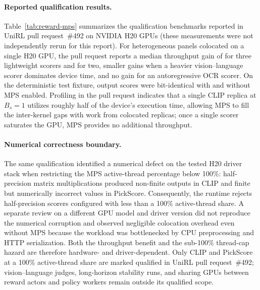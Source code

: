 \begin{table}[H]
\caption{Throughput gain (\%) of NVIDIA MPS over fractional GPU colocation without MPS for two or three replicas of a single scorer on one NVIDIA H20 GPU, as reported in UniRL pull request~\#492; $B_s$ denotes the scorer batch size. Dashes indicate batch sizes at which the scorer implementation does not execute a single batched forward pass.}
\label{tab:reward-mps}
\centering
\small

\end{table}

\paragraph{Reported qualification results.}
Table~\ref{tab:reward-mps} summarizes the qualification benchmarks reported in UniRL pull request~\#492 on NVIDIA H20 GPUs (these measurements were not independently rerun for this report).
For heterogeneous panels colocated on a single H20 GPU, the pull request reports a median throughput gain of \RSMpsThreeLight{} for three lightweight scorers and \RSMpsTwoLight{} for two, smaller gains when a heavier vision--language scorer dominates device time, and no gain for an autoregressive OCR scorer.
On the deterministic test fixture, output scores were bit-identical with and without MPS enabled.
Profiling in the pull request indicates that a single CLIP replica at $B_s{=}1$ utilizes roughly half of the device's execution time, allowing MPS to fill the inter-kernel gaps with work from colocated replicas; once a single scorer saturates the GPU, MPS provides no additional throughput.

\paragraph{Numerical correctness boundary.}
The same qualification identified a numerical defect on the tested H20 driver stack when restricting the MPS active-thread percentage below 100\%: half-precision matrix multiplications produced non-finite outputs in CLIP and finite but numerically incorrect values in PickScore.
Consequently, the runtime rejects half-precision scorers configured with less than a 100\% active-thread share.
A separate review on a different GPU model and driver version did not reproduce the numerical corruption and observed negligible colocation overhead even without MPS because the workload was bottlenecked by CPU preprocessing and HTTP serialization.
Both the throughput benefit and the sub-100\% thread-cap hazard are therefore hardware- and driver-dependent.
Only CLIP and PickScore at a 100\% active-thread share are marked qualified in UniRL pull request~\#492; vision--language judges, long-horizon stability runs, and sharing GPUs between reward actors and policy workers remain outside its qualified scope.

